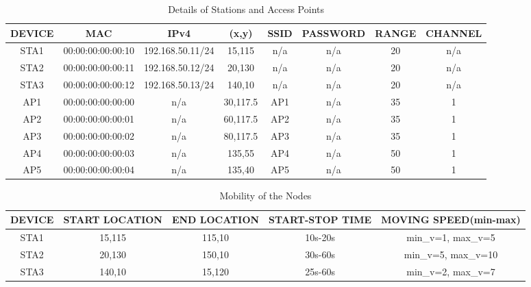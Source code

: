 \documentclass{article}
\begin{document}
\newpage
    \begin{table}[h]
        \centering
        \begin{tabular}{|c|c|c|c|c|c|c|c|}
        \hline
        DEVICE & MAC & IPv4 & (x,y) & SSID & PASSWORD & RANGE & CHANNEL\\
        \hline
        STA1 & 00:00:00:00:00:10 & 192.168.50.11/24 & 15,115 & n/a & n/a & 20 & n/a \\
        STA2 & 00:00:00:00:00:11 & 192.168.50.12/24 & 20,130 & n/a & n/a & 20 & n/a \\
        STA3 & 00:00:00:00:00:12 & 192.168.50.13/24 & 140,10 & n/a & n/a & 20 & n/a \\
        AP1 & 00:00:00:00:00:00 & n/a & 30,117.5 & AP1 & n/a & 35 & 1 \\
        AP2 & 00:00:00:00:00:01 & n/a & 60,117.5 & AP2 & n/a & 35 & 1 \\
        AP3 & 00:00:00:00:00:02 & n/a & 80,117.5 & AP3 & n/a & 35 & 1 \\
        AP4 & 00:00:00:00:00:03 & n/a & 135,55 & AP4 & n/a & 50 & 1 \\
        AP5 & 00:00:00:00:00:04 & n/a & 135,40 & AP5 & n/a & 50 & 1 \\
        \hline
        \end{tabular}
        \caption{Details of Stations and Access Points}
        \label{tab:1}
    \end{table}
    \begin{table}[h]
        \centering
        \begin{tabular}{|c|c|c|c|c|}
        \hline
        DEVICE & START LOCATION & END LOCATION & START-STOP TIME & MOVING SPEED(min-max)  \\
        \hline
        STA1 & 15,115 & 115,10 & 10s-20s & min_v=1, max_v=5 \\
        STA2 & 20,130 & 150,10 & 30s-60s & min_v=5, max_v=10 \\
        STA3 & 140,10 & 15,120 & 25s-60s & min_v=2, max_v=7 \\
        \hline
        \end{tabular}
        \caption{Mobility of the Nodes}
        \label{tab:2}
    \end{table}


\newpage
\end{document}
